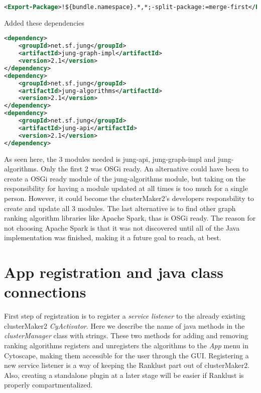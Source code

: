 \begin{lstlisting}[language=XML, caption={POM-file OSGi changes}]
<Export-Package>!${bundle.namespace}.*,*;-split-package:=merge-first</Export-Package>
\end{lstlisting}

Added these dependencies

\begin{lstlisting}[language=XML, caption={POM-file JUNG changes}]
<dependency>
    <groupId>net.sf.jung</groupId>
    <artifactId>jung-graph-impl</artifactId>
    <version>2.1</version>
</dependency>
<dependency>
    <groupId>net.sf.jung</groupId>
    <artifactId>jung-algorithms</artifactId>
    <version>2.1</version>
</dependency>
<dependency>
    <groupId>net.sf.jung</groupId>
    <artifactId>jung-api</artifactId>
    <version>2.1</version>
</dependency>
\end{lstlisting}

As seen here, the 3 modules needed is jung-api, jung-graph-impl and
jung-algorithms. Only the first 2 was OSGi ready. An alternative could have been
to create a OSGi ready module of the jung-algorithms module, but taking on the
responsibility for having a module updated at all times is too much for a single
person. However, it could become the clusterMaker2's developers responsbility to
create and update all 3 modules. The last alternative is to find other graph
ranking algorithm libraries like Apache Spark\cite{spark}, thas is OSGi ready.
The reason for not choosing Apache Spark is that it was not discovered until all
of the Java implementation was finished, making it a future goal to reach, at
best.

\section{App registration and java class connections}
First step of registration is to register a \textit{service listener} to the
already existing clusterMaker2 \textit{CyActivator}. Here we describe the name
of java methods in the \textit{clusterManager} class with strings. These two
methods for adding and removing ranking algorithms registers and unregisters the
algorithms to the \textit{App} menu in Cytoscape, making them accessible for the
user through the GUI. Registering a new service listener is a way of keeping the
Ranklust part out of clusterMaker2. Also, creating a standalone plugin at
a later stage will be easier if Ranklust is properly compartmentalized.


